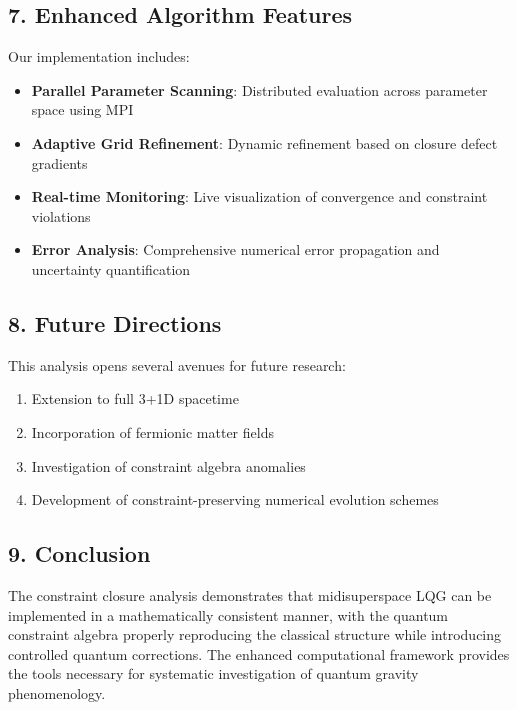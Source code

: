 \documentclass[12pt]{article}
\begin{document}
\subsection*{7. Enhanced Algorithm Features}
Our implementation includes:
\begin{itemize}
  \item \textbf{Parallel Parameter Scanning}: Distributed evaluation across parameter space using MPI
  \item \textbf{Adaptive Grid Refinement}: Dynamic refinement based on closure defect gradients
  \item \textbf{Real-time Monitoring}: Live visualization of convergence and constraint violations
  \item \textbf{Error Analysis}: Comprehensive numerical error propagation and uncertainty quantification
\end{itemize}

\subsection*{8. Future Directions}
This analysis opens several avenues for future research:
\begin{enumerate}
  \item Extension to full 3+1D spacetime
  \item Incorporation of fermionic matter fields
  \item Investigation of constraint algebra anomalies
  \item Development of constraint-preserving numerical evolution schemes
\end{enumerate}

\subsection*{9. Conclusion}
The constraint closure analysis demonstrates that midisuperspace LQG can be implemented in a mathematically consistent manner, with the quantum constraint algebra properly reproducing the classical structure while introducing controlled quantum corrections. The enhanced computational framework provides the tools necessary for systematic investigation of quantum gravity phenomenology.
\end{document}
